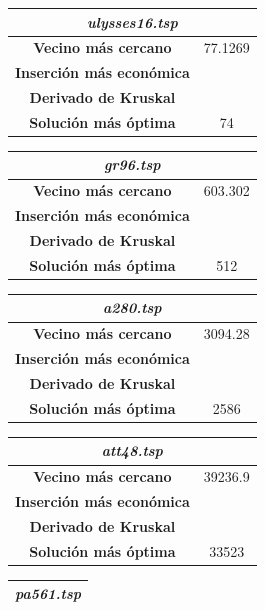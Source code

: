 \documentclass[12pt,spanish]{article}
\begin{document}
\begin{figure}[H]
\centering
\begin{tabular}{|c|c|}
\hline
\multicolumn{2}{|c|}{\textit{ulysses16.tsp}}\\
\hline
\textbf{Vecino más cercano} & 77.1269\\
\textbf{Inserción más económica} & \\
\textbf{Derivado de Kruskal} & \\
\textbf{Solución más óptima} & 74\\
\hline
\end{tabular}
\vspace{0.5cm}
\quad
\begin{tabular}{|c|c|}
\hline	
\multicolumn{2}{|c|}{\textit{gr96.tsp}}\\
\hline
\textbf{Vecino más cercano} & 603.302\\
\textbf{Inserción más económica} & \\
\textbf{Derivado de Kruskal} & \\
\textbf{Solución más óptima} & 512\\
\hline	
\end{tabular}
\vspace{0.5cm}
\quad
\begin{tabular}{|c|c|}
\hline	
\multicolumn{2}{|c|}{\textit{a280.tsp}}\\
\hline
\textbf{Vecino más cercano} & 3094.28\\
\textbf{Inserción más económica} & \\
\textbf{Derivado de Kruskal} & \\
\textbf{Solución más óptima} & 2586\\
\hline	
\end{tabular}
\vspace{0.5cm}
\quad
\begin{tabular}{|c|c|}
\hline	
\multicolumn{2}{|c|}{\textit{att48.tsp}}\\
\hline
\textbf{Vecino más cercano} & 39236.9\\
\textbf{Inserción más económica} & \\
\textbf{Derivado de Kruskal} & \\
\textbf{Solución más óptima} & 33523\\
\hline	
\end{tabular}
\vspace{0.5cm}
\quad
\begin{tabular}{|c|c|}
\hline	
\multicolumn{2}{|c|}{\textit{pa561.tsp}}\\
\hline

\end{tabular}
\end{figure}
\end{document}
